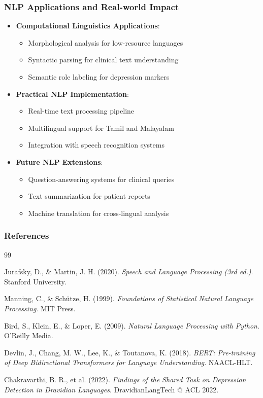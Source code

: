 \documentclass{beamer}
\begin{document}
\begin{frame}
\frametitle{NLP Applications and Real-world Impact}
\begin{itemize}
    \item \textbf{Computational Linguistics Applications}:
    \begin{itemize}
        \item Morphological analysis for low-resource languages
        \item Syntactic parsing for clinical text understanding
        \item Semantic role labeling for depression markers
    \end{itemize}
    \item \textbf{Practical NLP Implementation}:
    \begin{itemize}
        \item Real-time text processing pipeline
        \item Multilingual support for Tamil and Malayalam
        \item Integration with speech recognition systems
    \end{itemize}
    \item \textbf{Future NLP Extensions}:
    \begin{itemize}
        \item Question-answering systems for clinical queries
        \item Text summarization for patient reports
        \item Machine translation for cross-lingual analysis
    \end{itemize}
\end{itemize}
\end{frame}

\begin{frame}
\frametitle{References}
\scriptsize
\begin{thebibliography}{99}

Jurafsky, D., \& Martin, J. H. (2020). 
\textit{Speech and Language Processing (3rd ed.)}. 
Stanford University.

Manning, C., \& Schütze, H. (1999). 
\textit{Foundations of Statistical Natural Language Processing}. 
MIT Press.

Bird, S., Klein, E., \& Loper, E. (2009). 
\textit{Natural Language Processing with Python}. 
O'Reilly Media.

Devlin, J., Chang, M. W., Lee, K., \& Toutanova, K. (2018). 
\textit{BERT: Pre-training of Deep Bidirectional Transformers for Language Understanding}. 
NAACL-HLT.

Chakravarthi, B. R., et al. (2022). 
\textit{Findings of the Shared Task on Depression Detection in Dravidian Languages}. 
DravidianLangTech @ ACL 2022.

\end{thebibliography}
\end{frame}
\end{document}
